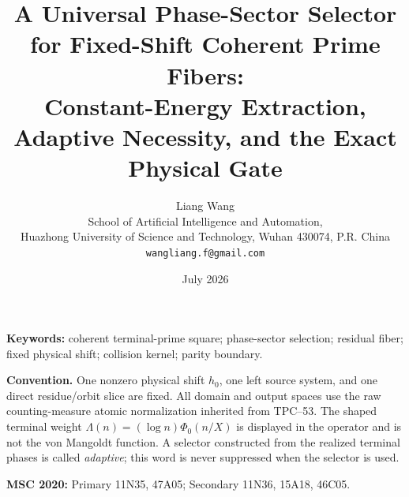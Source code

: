 \documentclass[11pt]{article}
\title{\bfseries A Universal Phase-Sector Selector for Fixed-Shift Coherent Prime Fibers:\\
Constant-Energy Extraction, Adaptive Necessity, and the Exact Physical Gate}
\author{Liang Wang\\
\small School of Artificial Intelligence and Automation,\\[-2pt]
\small Huazhong University of Science and Technology, Wuhan 430074, P.R. China\\
\small \texttt{wangliang.f@gmail.com}}
\date{July 2026}
\theoremstyle{definition}
\theoremstyle{remark}
\begin{document}
\maketitle



\noindent\textbf{Keywords:} coherent terminal-prime square; phase-sector
selection; residual fiber; fixed physical shift; collision kernel; parity
boundary.

\medskip
\noindent\textbf{Convention.}
One nonzero physical shift \(h_0\), one left source system, and one direct
residue/orbit slice are fixed.  All domain and output spaces use the raw
counting-measure atomic normalization inherited from TPC--53.  The shaped
terminal weight
\(\Lambda(n)=(\log n)\Phi_0(n/X)\) is displayed in the operator and is not
the von Mangoldt function.  A selector constructed from the realized
terminal phases is called \emph{adaptive}; this word is never suppressed
when the selector is used.

\medskip
\noindent\textbf{MSC 2020:} Primary 11N35, 47A05; Secondary 11N36,
15A18, 46C05.









\begingroup
\small
\raggedright
\setlength{\bibsep}{4pt plus 1pt minus 1pt}


\endgroup
\end{document}
